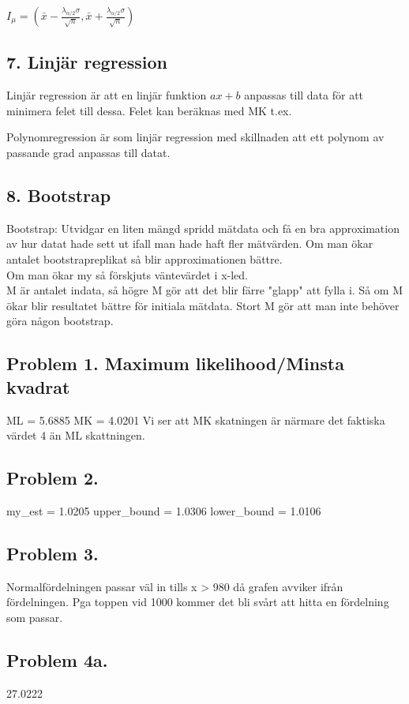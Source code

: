 \documentclass{article}
\begin{document}
$I_{{\mu }}=({\bar  {x}}-{\frac  {\lambda _{{\alpha /2}}\sigma }{{\sqrt
{n}}}},{\bar  {x}}+{\frac  {\lambda _{{\alpha /2}}\sigma }{{\sqrt  {n}}}})$

\subsection*{7. Linjär regression}
Linjär regression är att en linjär funktion $ax+b$ anpassas till data för att
minimera felet till dessa. Felet kan beräknas med MK t.ex.

Polynomregression är som linjär regression med skillnaden att ett polynom av
passande grad anpassas till datat.


\subsection*{8. Bootstrap}
Bootstrap: Utvidgar en liten mängd spridd mätdata och få en bra approximation av
hur datat hade sett ut ifall man hade haft fler mätvärden. Om man ökar antalet
bootstrapreplikat så blir approximationen bättre.
\\Om man ökar my så förskjuts väntevärdet i x-led.
\\M är antalet indata, så högre M gör att det blir färre "glapp" att fylla i. Så
om M ökar blir resultatet bättre för initiala mätdata. Stort M gör att man inte
behöver göra någon bootstrap.

\subsection*{Problem 1. Maximum likelihood/Minsta kvadrat}
ML = 5.6885
MK = 4.0201
Vi ser att MK skatningen är närmare det faktiska värdet 4 än ML skattningen.

\subsection*{Problem 2.}
my\_est = 1.0205
upper\_bound = 1.0306
lower\_bound = 1.0106

\subsection*{Problem 3.}
Normalfördelningen passar väl in tills x > 980 då grafen avviker ifrån
fördelningen. Pga toppen vid 1000 kommer det bli svårt att hitta en fördelning
som passar.

\subsection*{Problem 4a.}
27.0222
\end{document}
